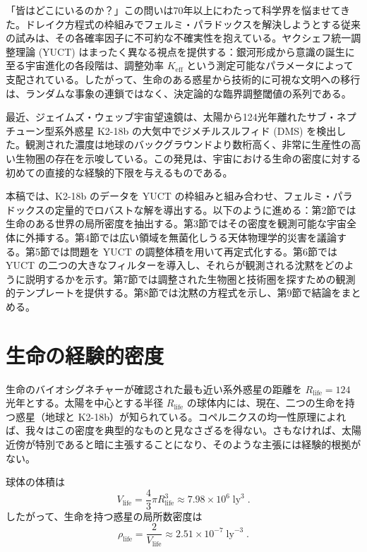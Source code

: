 \documentclass[11pt,a4paper]{article}
\newcommand{\Keff}{K_{\mathrm{eff}}}
\begin{document}
	「皆はどこにいるのか？」この問いは70年以上にわたって科学界を悩ませてきた。ドレイク方程式の枠組みでフェルミ・パラドックスを解決しようとする従来の試みは、その各確率因子に不可約な不確実性を抱えている。ヤクシェフ統一調整理論 (YUCT) はまったく異なる視点を提供する：銀河形成から意識の誕生に至る宇宙進化の各段階は、調整効率 \(\Keff\) という測定可能なパラメータによって支配されている。したがって、生命のある惑星から技術的に可視な文明への移行は、ランダムな事象の連鎖ではなく、決定論的な臨界調整閾値の系列である。
	
	最近、ジェイムズ・ウェッブ宇宙望遠鏡は、太陽から124光年離れたサブ・ネプチューン型系外惑星 K2-18b の大気中でジメチルスルフィド (DMS) を検出した。観測された濃度は地球のバックグラウンドより数桁高く、非常に生産性の高い生物圏の存在を示唆している。この発見は、宇宙における生命の密度に対する初めての直接的な経験的下限を与えるものである。
	
	本稿では、K2-18b のデータを YUCT の枠組みと組み合わせ、フェルミ・パラドックスの定量的でロバストな解を導出する。以下のように進める：第2節では生命のある世界の局所密度を抽出する。第3節ではその密度を観測可能な宇宙全体に外挿する。第4節では広い領域を無菌化しうる天体物理学的災害を議論する。第5節では問題を YUCT の調整体積を用いて再定式化する。第6節では YUCT の二つの大きなフィルターを導入し、それらが観測される沈黙をどのように説明するかを示す。第7節では調整された生物圏と技術圏を探すための観測的テンプレートを提供する。第8節では沈黙の方程式を示し、第9節で結論をまとめる。
	
	\section{生命の経験的密度}
	\label{sec:empirical}
	生命のバイオシグネチャーが確認された最も近い系外惑星の距離を \(R_{\mathrm{life}} = 124\) 光年とする。太陽を中心とする半径 \(R_{\mathrm{life}}\) の球体内には、現在、二つの生命を持つ惑星（地球と K2-18b）が知られている。コペルニクスの均一性原理によれば、我々はこの密度を典型的なものと見なさざるを得ない。さもなければ、太陽近傍が特別であると暗に主張することになり、そのような主張には経験的根拠がない。
	
	球体の体積は
	\begin{equation}
		V_{\mathrm{life}} = \frac{4}{3}\pi R_{\mathrm{life}}^{3}
		\approx 7.98\times 10^{6}\;\mathrm{ly}^{3}\; .
	\end{equation}
	したがって、生命を持つ惑星の局所数密度は
	\begin{equation}
		\rho_{\mathrm{life}} = \frac{2}{V_{\mathrm{life}}}
		\approx 2.51\times 10^{-7}\;\mathrm{ly}^{-3}\; .
	\end{equation}
	
\end{document}
